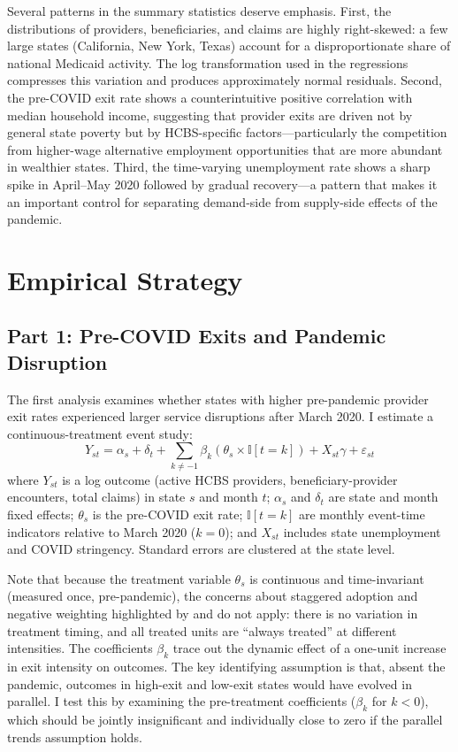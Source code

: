 \documentclass[12pt]{article}
\newcommand{\ind}{\mathbb{I}}
\begin{document}
Several patterns in the summary statistics deserve emphasis. First, the distributions of providers, beneficiaries, and claims are highly right-skewed: a few large states (California, New York, Texas) account for a disproportionate share of national Medicaid activity. The log transformation used in the regressions compresses this variation and produces approximately normal residuals. Second, the pre-COVID exit rate shows a counterintuitive positive correlation with median household income, suggesting that provider exits are driven not by general state poverty but by HCBS-specific factors---particularly the competition from higher-wage alternative employment opportunities that are more abundant in wealthier states. Third, the time-varying unemployment rate shows a sharp spike in April--May 2020 followed by gradual recovery---a pattern that makes it an important control for separating demand-side from supply-side effects of the pandemic.


\section{Empirical Strategy}

\subsection{Part 1: Pre-COVID Exits and Pandemic Disruption}

The first analysis examines whether states with higher pre-pandemic provider exit rates experienced larger service disruptions after March 2020. I estimate a continuous-treatment event study:
\begin{equation}
Y_{st} = \alpha_s + \delta_t + \sum_{k \neq -1} \beta_k \left( \theta_s \times \ind[t = k] \right) + X_{st} \gamma + \varepsilon_{st}
\label{eq:eventstudy}
\end{equation}
where $Y_{st}$ is a log outcome (active HCBS providers, beneficiary-provider encounters, total claims) in state $s$ and month $t$; $\alpha_s$ and $\delta_t$ are state and month fixed effects; $\theta_s$ is the pre-COVID exit rate; $\ind[t = k]$ are monthly event-time indicators relative to March 2020 ($k = 0$); and $X_{st}$ includes state unemployment and COVID stringency. Standard errors are clustered at the state level.

Note that because the treatment variable $\theta_s$ is continuous and time-invariant (measured once, pre-pandemic), the concerns about staggered adoption and negative weighting highlighted by \citet{goodmanbacon2021} and \citet{callaway2021} do not apply: there is no variation in treatment timing, and all treated units are ``always treated'' at different intensities. The coefficients $\beta_k$ trace out the dynamic effect of a one-unit increase in exit intensity on outcomes. The key identifying assumption is that, absent the pandemic, outcomes in high-exit and low-exit states would have evolved in parallel. I test this by examining the pre-treatment coefficients ($\beta_k$ for $k < 0$), which should be jointly insignificant and individually close to zero if the parallel trends assumption holds.
\end{document}
